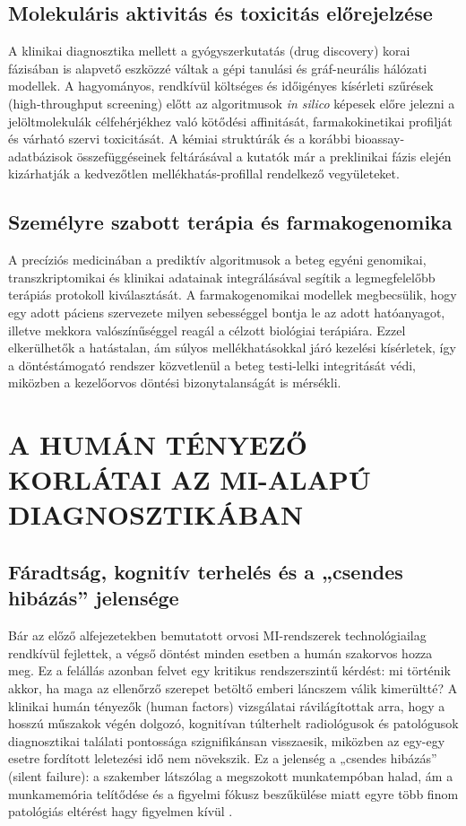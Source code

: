 \documentclass[12pt,a4paper,oneside]{book}
\begin{document}
\subsection{Molekuláris aktivitás és toxicitás előrejelzése}

A klinikai diagnosztika mellett a gyógyszerkutatás (drug discovery) korai fázisában is alapvető eszközzé váltak a gépi tanulási és gráf-neurális hálózati modellek. A hagyományos, rendkívül költséges és időigényes kísérleti szűrések (high-throughput screening) előtt az algoritmusok \emph{in silico} képesek előre jelezni a jelöltmolekulák célfehérjékhez való kötődési affinitását, farmakokinetikai profilját és várható szervi toxicitását. A kémiai struktúrák és a korábbi bioassay-adatbázisok összefüggéseinek feltárásával a kutatók már a preklinikai fázis elején kizárhatják a kedvezőtlen mellékhatás-profillal rendelkező vegyületeket.

\subsection{Személyre szabott terápia és farmakogenomika}

A precíziós medicinában a prediktív algoritmusok a beteg egyéni genomikai, transzkriptomikai és klinikai adatainak integrálásával segítik a legmegfelelőbb terápiás protokoll kiválasztását. A farmakogenomikai modellek megbecsülik, hogy egy adott páciens szervezete milyen sebességgel bontja le az adott hatóanyagot, illetve mekkora valószínűséggel reagál a célzott biológiai terápiára. Ezzel elkerülhetők a hatástalan, ám súlyos mellékhatásokkal járó kezelési kísérletek, így a döntéstámogató rendszer közvetlenül a beteg testi-lelki integritását védi, miközben a kezelőorvos döntési bizonytalanságát is mérsékli.

\section{A HUMÁN TÉNYEZŐ KORLÁTAI AZ MI-ALAPÚ DIAGNOSZTIKÁBAN}

\subsection{Fáradtság, kognitív terhelés és a „csendes hibázás” jelensége}

Bár az előző alfejezetekben bemutatott orvosi MI-rendszerek technológiailag rendkívül fejlettek, a végső döntést minden esetben a humán szakorvos hozza meg. Ez a felállás azonban felvet egy kritikus rendszerszintű kérdést: mi történik akkor, ha maga az ellenőrző szerepet betöltő emberi láncszem válik kimerültté? A klinikai humán tényezők (human factors) vizsgálatai rávilágítottak arra, hogy a hosszú műszakok végén dolgozó, kognitívan túlterhelt radiológusok és patológusok diagnosztikai találati pontossága szignifikánsan visszaesik, miközben az egy-egy esetre fordított leletezési idő nem növekszik. Ez a jelenség a „csendes hibázás” (silent failure): a szakember látszólag a megszokott munkatempóban halad, ám a munkamemória telítődése és a figyelmi fókusz beszűkülése miatt egyre több finom patológiás eltérést hagy figyelmen kívül \cite{wang2026}.
\end{document}
